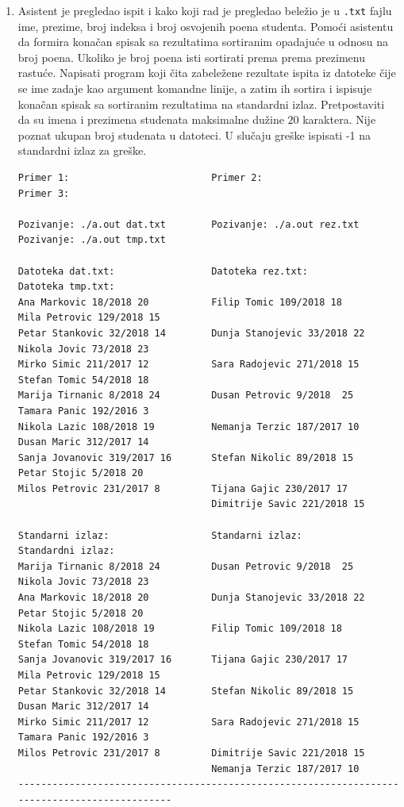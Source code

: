 \begin{enumerate} 
\item Asistent je pregledao ispit i kako koji rad je pregledao beležio je u \texttt{.txt} fajlu ime, prezime, broj indeksa i broj osvojenih poena studenta. Pomoći asistentu da formira konačan spisak sa rezultatima sortiranim opadajuće u odnosu na broj poena. Ukoliko je broj poena isti sortirati prema prema prezimenu rastuće. Napisati program koji čita zabeležene rezultate ispita iz datoteke čije se ime zadaje kao argument komandne linije, a zatim ih sortira i ispisuje konačan spisak sa sortiranim rezultatima na standardni izlaz. Pretpostaviti da su imena i prezimena studenata maksimalne dužine $20$ karaktera. Nije poznat ukupan broj studenata u datoteci. U slučaju greške ispisati -1 na standardni izlaz za greške.

\begin{verbatim}
Primer 1:                         Primer 2:                           Primer 3:

Pozivanje: ./a.out dat.txt        Pozivanje: ./a.out rez.txt        Pozivanje: ./a.out tmp.txt

Datoteka dat.txt:                 Datoteka rez.txt:                 Datoteka tmp.txt:
Ana Markovic 18/2018 20           Filip Tomic 109/2018 18           Mila Petrovic 129/2018 15
Petar Stankovic 32/2018 14        Dunja Stanojevic 33/2018 22       Nikola Jovic 73/2018 23
Mirko Simic 211/2017 12           Sara Radojevic 271/2018 15        Stefan Tomic 54/2018 18
Marija Tirnanic 8/2018 24         Dusan Petrovic 9/2018  25         Tamara Panic 192/2016 3
Nikola Lazic 108/2018 19          Nemanja Terzic 187/2017 10        Dusan Maric 312/2017 14   
Sanja Jovanovic 319/2017 16       Stefan Nikolic 89/2018 15         Petar Stojic 5/2018 20
Milos Petrovic 231/2017 8         Tijana Gajic 230/2017 17
                                  Dimitrije Savic 221/2018 15            

Standarni izlaz:                  Standarni izlaz:                  Standardni izlaz:
Marija Tirnanic 8/2018 24         Dusan Petrovic 9/2018  25         Nikola Jovic 73/2018 23
Ana Markovic 18/2018 20           Dunja Stanojevic 33/2018 22       Petar Stojic 5/2018 20
Nikola Lazic 108/2018 19          Filip Tomic 109/2018 18           Stefan Tomic 54/2018 18
Sanja Jovanovic 319/2017 16       Tijana Gajic 230/2017 17          Mila Petrovic 129/2018 15
Petar Stankovic 32/2018 14        Stefan Nikolic 89/2018 15         Dusan Maric 312/2017 14 
Mirko Simic 211/2017 12           Sara Radojevic 271/2018 15        Tamara Panic 192/2016 3
Milos Petrovic 231/2017 8         Dimitrije Savic 221/2018 15
                                  Nemanja Terzic 187/2017 10
----------------------------------------------------------------------------------------------


\end{verbatim}
\end{enumerate}
